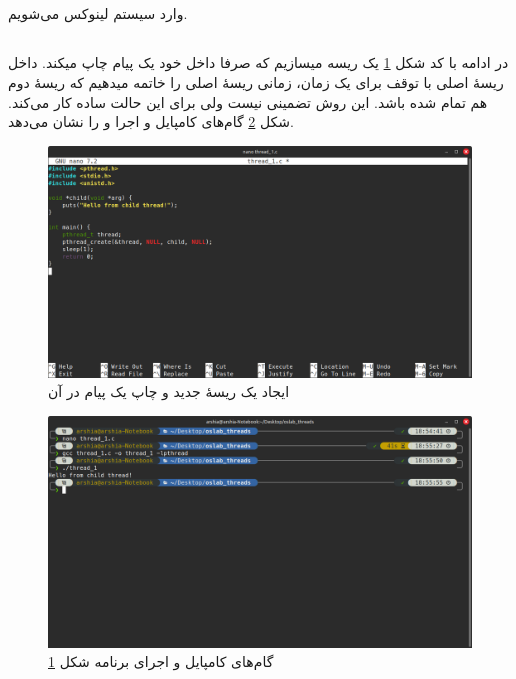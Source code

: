 \documentclass[12pt]{article}
\begin{document}
	\subsection{}
	وارد سیستم لینوکس می‌شویم.
	\subsection{}
	در ادامه با کد شکل \ref{img:1} یک ریسه میسازیم که صرفا داخل خود یک پیام چاپ میکند. داخل ریسهٔ اصلی با توقف برای یک زمان، زمانی ریسهٔ اصلی را خاتمه میدهیم که ریسهٔ دوم هم تمام شده باشد. این روش تضمینی نیست ولی برای این حالت ساده کار می‌کند. شکل \ref{img:2} گام‌های کامپایل و اجرا و را نشان می‌دهد.
	\begin{figure}[H]
		\centering
		\includegraphics[width=\textwidth]{report7-resources/1.png}
		\caption{ایجاد یک ریسهٔ جدید و چاپ یک پیام در آن}
		\label{img:1}
	\end{figure}
	\begin{figure}[H]
		\centering
		\includegraphics[width=\textwidth]{report7-resources/2.png}
		\caption{گام‌های کامپایل و اجرای برنامه شکل \ref{img:1}}
		\label{img:2}
	\end{figure}
\end{document}
